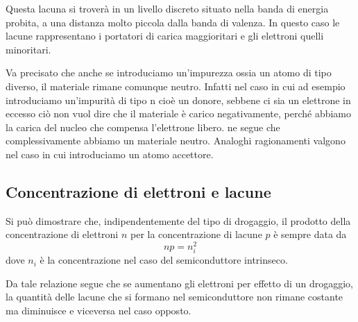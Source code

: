 Questa lacuna si troverà in un livello discreto situato nella banda di energia probita, a una distanza molto piccola dalla banda di valenza. In questo caso le lacune rappresentano i portatori di carica maggioritari e gli elettroni quelli minoritari.

Va precisato che anche se introduciamo un'impurezza ossia un atomo di tipo diverso, il materiale rimane comunque neutro. Infatti nel caso in cui ad esempio introduciamo un'impurità di tipo n cioè un donore, sebbene ci sia un elettrone in eccesso ciò non vuol dire che il materiale è carico negativamente, perché abbiamo la carica del nucleo che compensa l'elettrone libero. ne segue che complessivamente abbiamo un materiale neutro. Analoghi ragionamenti valgono nel caso in cui introduciamo un atomo accettore.

\subsection{Concentrazione di elettroni e lacune}
Si può dimostrare che, indipendentemente del tipo di drogaggio, il prodotto della concentrazione di elettroni $n$ per la concentrazione di lacune $p$ è sempre data da
\begin{equation*}
   np=n_i^2
\end{equation*}
dove $n_i$ è la concentrazione nel caso del semiconduttore intrinseco.

Da tale relazione segue che se aumentano gli elettroni per effetto di un drogaggio, la quantità delle lacune che si formano nel semiconduttore non rimane costante ma diminuisce e viceversa nel caso opposto. 

